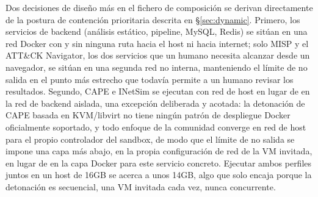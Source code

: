 Dos decisiones de dise\~no m\'as en el fichero de composici\'on se derivan
directamente de la postura de contenci\'on prioritaria descrita en
\S\ref{sec:dynamic}. Primero, los servicios de backend (an\'alisis
est\'atico, pipeline, MySQL, Redis) se sit\'uan en una red Docker con
 y sin ninguna ruta hacia el host ni hacia
internet; solo MISP y el ATT\&CK Navigator, los dos servicios que un
humano necesita alcanzar desde un navegador, se sit\'uan en una segunda
red no interna, manteniendo el l\'imite de no salida en el punto m\'as
estrecho que todav\'ia permite a un humano revisar los resultados.
Segundo, CAPE e INetSim se ejecutan con red de host en lugar de en la
red de backend aislada, una excepci\'on deliberada y acotada: la
detonaci\'on de CAPE basada en KVM/libvirt no tiene ning\'un patr\'on de
despliegue Docker oficialmente soportado, y todo enfoque de la
comunidad converge en red de host para el propio controlador del
sandbox, de modo que el l\'imite de no salida se impone una capa m\'as
abajo, en la propia configuraci\'on de red de la VM invitada, en lugar
de en la capa Docker para este servicio concreto. Ejecutar ambos
perfiles juntos en un host de 16GB se acerca a unos 14GB, algo que solo
encaja porque la detonaci\'on es secuencial, una VM invitada cada vez,
nunca concurrente.
